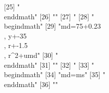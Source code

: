 [25] "\\end{dmath}"                                                                
[26] ""                                                                            
[27] "%
[28] "\\begin{dmath}"                                                              
[29] "{md}=75+0.23\\, {y}+-35\\, {r}+-1.5\\, {r}^{2}+{umd}"                        
[30] "\\end{dmath}"                                                                
[31] ""                                                                            
[32] "%
[33] "\\begin{dmath}"                                                              
[34] "{md}={ms}"                                                                   
[35] "\\end{dmath}"                                                                
[36] ""                                                                            
